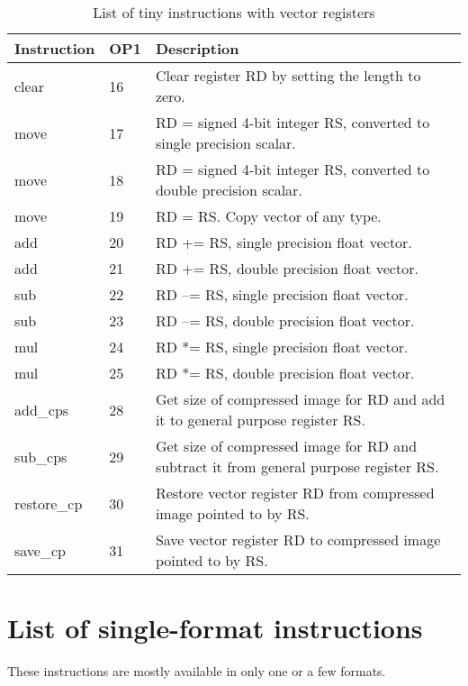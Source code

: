 \documentclass[forwardcom.tex]{subfiles}
\begin{document}
\begin{longtable} {|p{20mm}|p{8mm}|p{80mm}|}
\caption{List of tiny instructions with vector registers}
\label{table:tinyInstructionsVector}  \\
\endfirsthead
\endhead
\hline
\bfseries Instruction & \bfseries OP1 & \bfseries Description \\
\hline
clear         & 16 & Clear register RD by setting the length to zero. \\
move          & 17 & RD = signed 4-bit integer RS, converted to single precision scalar. \\
move          & 18 & RD = signed 4-bit integer RS, converted to double precision scalar. \\
move          & 19 & RD = RS. Copy vector of any type. \\
add           & 20 & RD += RS, single precision float vector. \\
add           & 21 & RD += RS, double precision float vector. \\
sub           & 22 & RD --= RS, single precision float vector. \\
sub           & 23 & RD --= RS, double precision float vector. \\
mul           & 24 & RD *= RS, single precision float vector. \\
mul           & 25 & RD *= RS, double precision float vector. \\
add\_cps      & 28 & Get size of compressed image for RD and add it to general purpose register RS. \\
sub\_cps      & 29 & Get size of compressed image for RD and subtract it from general purpose register RS. \\
restore\_cp   & 30 & Restore vector register RD from compressed image pointed to by RS. \\
save\_cp      & 31 & Save vector register RD to compressed image pointed to by RS. \\
\hline
\end{longtable}

\section{List of single-format instructions}
These instructions are mostly available in only one or a few formats.
\end{document}
